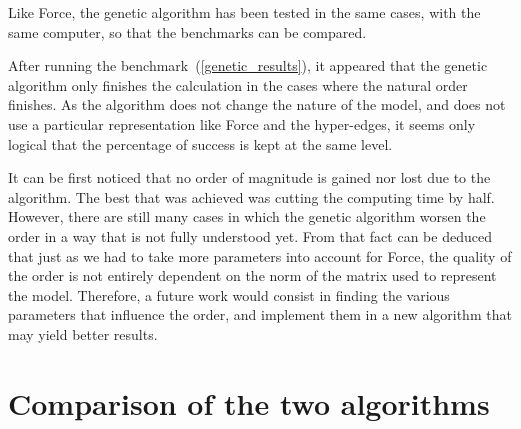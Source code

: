 \documentclass[12pt]{report}
\begin{document}
Like Force, the genetic algorithm has been tested in the same cases, with the same computer, so that the benchmarks can be compared.

After running the benchmark~(\ref{genetic_results}), it appeared that the genetic algorithm only finishes the calculation in the cases where the natural order finishes. As the algorithm does not change the nature of the model, and does not use a particular representation like Force and the hyper-edges, it seems only logical that the percentage of success is kept at the same level.

It can be first noticed that no order of magnitude is gained nor lost due to the algorithm. The best that was achieved was cutting the computing time by half. However, there are still many cases in which the genetic algorithm worsen the order in a way that is not fully understood yet. From that fact can be deduced that just as we had to take more parameters into account for Force, the quality of the order is not entirely dependent on the norm of the matrix used to represent the model. Therefore, a future work would consist in finding the various parameters that influence the order, and implement them in a new algorithm that may yield better results.

\newpage
\section{Comparison of the two algorithms}

\begin{table}[!h]
  \begin{center}
    \hspace*{-1cm}
    \label{all_results}
    \caption{Experimental results (in percentages)}
  \end{center}
\end{table}
\end{document}
